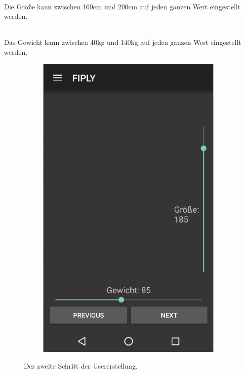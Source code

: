 \documentclass[FIPLY_base.tex]{subfiles}
\begin{document}
\ \\
Die Größe kann zwischen 100cm und 200cm auf jeden ganzen Wert eingestellt werden.

\ \\
Das Gewicht kann zwischen 40kg und 140kg auf jeden ganzen Wert eingestellt werden.
\begin{figure}[H]
	\begin{subfigure}[b]{0.3\textwidth}
	\includegraphics[scale=0.55]{img/User_step2}
	\end{subfigure}
	\hfil
	\caption{Der zweite Schritt der Usererstellung.}
\end{figure}
\newpage
\end{document}
